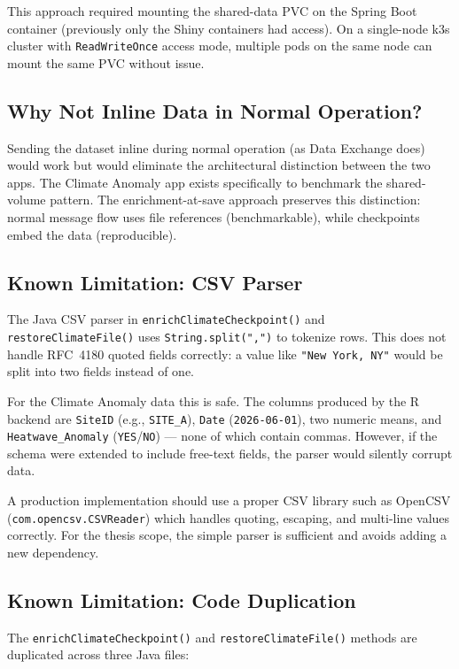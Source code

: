 \documentclass[11pt,a4paper]{article}
\begin{document}
This approach required mounting the shared-data PVC on the Spring Boot container
(previously only the Shiny containers had access). On a single-node k3s cluster
with \texttt{ReadWriteOnce} access mode, multiple pods on the same node can
mount the same PVC without issue.

\subsection{Why Not Inline Data in Normal Operation?}

Sending the dataset inline during normal operation (as Data Exchange does) would
work but would eliminate the architectural distinction between the two apps.
The Climate Anomaly app exists specifically to benchmark the shared-volume
pattern. The enrichment-at-save approach preserves this distinction: normal
message flow uses file references (benchmarkable), while checkpoints embed the
data (reproducible).

\subsection{Known Limitation: CSV Parser}

The Java CSV parser in \texttt{enrichClimateCheckpoint()} and
\texttt{restoreClimateFile()} uses \texttt{String.split(",")} to tokenize rows.
This does not handle RFC~4180 quoted fields correctly: a value like
\texttt{"New York, NY"} would be split into two fields instead of one.

For the Climate Anomaly data this is safe. The columns produced by the R backend
are \texttt{SiteID} (e.g., \texttt{SITE\_A}), \texttt{Date}
(\texttt{2026-06-01}), two numeric means, and \texttt{Heatwave\_Anomaly}
(\texttt{YES}/\texttt{NO}) --- none of which contain commas. However, if the
schema were extended to include free-text fields, the parser would silently
corrupt data.

A production implementation should use a proper CSV library such as OpenCSV
(\texttt{com.opencsv.CSVReader}) which handles quoting, escaping, and
multi-line values correctly. For the thesis scope, the simple parser is
sufficient and avoids adding a new dependency.

\subsection{Known Limitation: Code Duplication}

The \texttt{enrichClimateCheckpoint()} and \texttt{restoreClimateFile()} methods
are duplicated across three Java files:
\end{document}
